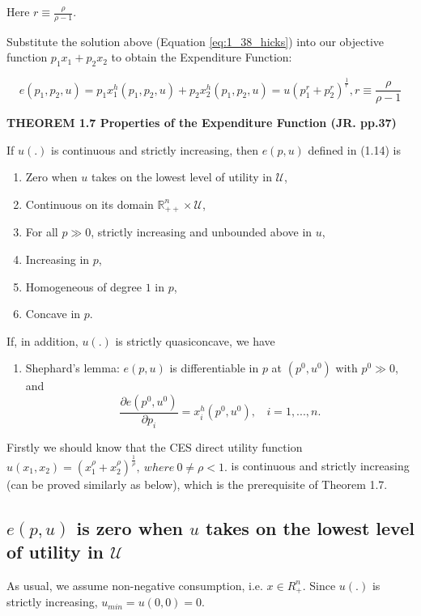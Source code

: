 \documentclass{article}
\newcommand{\R}{\mathbb{R}}
\begin{document}
\begin{mdframed}[backgroundcolor=blue!20,linecolor=white]
Here $r \equiv \frac{\rho}{\rho - 1}$.

Substitute the solution above (Equation \ref{eq:1_38_hicks}) into our
objective function  $p_1x_1 + p_2x_2$ to obtain the Expenditure Function:

$$e(p_1,p_2, u) = p_1x_1^h(p_1,p_2,u) + p_2x_2^h(p_1,p_2,u) = 
u(p_1^{r} + p_2^{r})^{\frac{1}{r}} , r \equiv \frac{\rho}{\rho - 1}$$

\textbf{THEOREM 1.7 Properties of the Expenditure Function (JR. pp.37)}

\medskip

If $u(.)$ is continuous and strictly increasing, then $e(p, u)$ defined in (1.14) is

\begin{enumerate}
\item Zero when $u$ takes on the lowest level of utility in $\mathcal{U}$,
\item Continuous on its domain $\R^n_{++} \times \mathcal{U}$,
\item For all $p \gg 0$, strictly increasing and unbounded above in $u$,
\item Increasing in $p$,
\item Homogeneous of degree $1$ in $p$,
\item Concave in $p$.
\end{enumerate}
If, in addition, $u(.)$ is strictly quasiconcave, we have
\begin{enumerate}[start = 7]
\item Shephard’s lemma: $e(p, u)$ is differentiable in $p$ at $(p^0, u^0)$ with $p^0 \gg 0$, and
$$\frac{\partial e(p^0, u^0)}{\partial p_i} = x^h_i (p^0, u^0), \ \ \ \ i = 1, . . . , n.$$
\end{enumerate}
\end{mdframed}

Firstly we should know that the CES direct utility function $u(x_1, x_2) = (x_1^{\rho} + x_2^{\rho})^{\frac{1}{\rho}},\ where \ 0 \ne \rho<1.$ is continuous and strictly increasing (can be proved similarly as below), which is the
prerequisite of Theorem 1.7.

\subsection{$e(p, u)$ is zero when $u$ takes on the lowest level of utility in $\mathcal{U}$}

As usual, we assume non-negative consumption, i.e. $x \in R^n_+$. Since $u(.)$ is strictly increasing,
$u_{min} = u(0,0) = 0$. 
\end{document}
